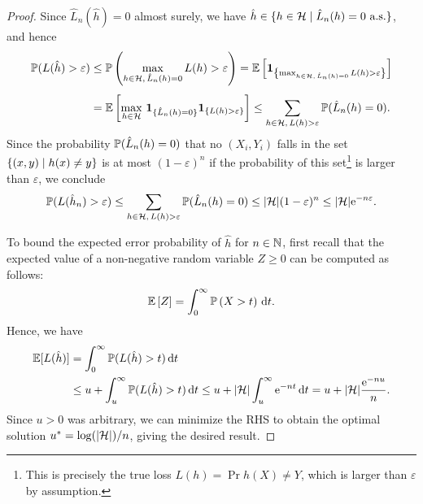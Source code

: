 \begin{proof}
Since $\hat L_n(\hat h) = 0$ almost surely, we have $\hat h \in \{h \in \mathcal{H} \with \hat L_n(h) = 0 \text{ a.s.}\}$, and hence
\begin{align*}
    \P(L(\hat h) > \varepsilon) &\leq \Pr{\max_{h \in \mathcal{H}, \, \hat L_n(h) = 0} L(h) > \varepsilon} = \Ex{\indSet{\max_{h \in \mathcal{H}, \, \hat L_n(h) = 0} L(h) > \varepsilon}} \\[4pt]
        &=\Ex{\max_{h\in\mathcal{H}} \, \mathbf{1}_{\{\hat L_n(h) = 0\}} \indSet{L(h) > \varepsilon}} \leq \sum_{h\in\mathcal{H}, \, L(h) > \varepsilon} \P(\hat L_n(h) = 0).
\end{align*}
Since the probability $\P(\hat L_n(h) = 0)$ that no $(X_i, Y_i)$ falls in the set $\set{(x, y) \with h(x) \neq y}$ is at most $(1 - \varepsilon)^n$ if the probability of this set\footnote{This is precisely the true loss $L(h) = \Pr{h(X) \neq Y}$, which is larger than $\varepsilon$ by assumption.} is larger than $\varepsilon$, we conclude
\[
    \P(L(\hat h_n) > \varepsilon) \leq \sum_{h\in\mathcal{H}, \, L(h) > \varepsilon} \P(\hat L_n(h) = 0) \leq \abs{\mathcal{H}} (1 - \varepsilon)^n \leq \abs{\mathcal{H}} \e^{-n \varepsilon}.
\]

To bound the expected error probability of $\hat h$ for $n \in \N$, first recall that the expected value of a non-negative random variable $Z \geq 0$ can be computed as follows:
\[
    \Ex{Z} = \int_0^\infty \Pr{X > t} \dt.
\]
Hence, we have
\begin{align*}
    \ex{L(\hat h)} &= \int_0^\infty \P(L(\hat h) > t) \dt \\
        &\leq u + \int_u^\infty \P(L(\hat h) > t) \dt \leq u + \abs{\mathcal{H}} \int_u^\infty \e^{-nt} \dt = u + \abs{\mathcal{H}} \frac{\e^{-nu}}{n}.
\end{align*}
Since $u > 0$ was arbitrary, we can minimize the RHS to obtain the optimal solution $u^* = \log(\abs{\mathcal{H}}) / n$, giving the desired result.
\end{proof}
